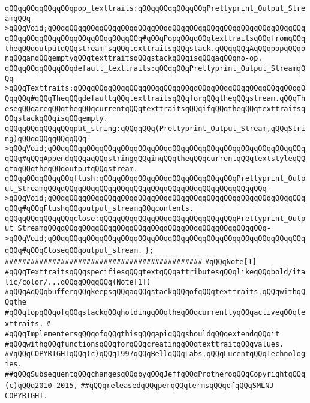 \verb|qQQqqQQqqQQqqQQqpop_texttraits:qQQqqQQqqQQqqQQqPrettyprint_Output_StreamqQQq->qQQqVoid;qQQqqQQqqQQqqQQqqQQqqQQqqQQqqQQqqQQqqQQqqQQqqQQqqQQqqQQqqQQqqQQqqQQqqQQqqQQqqQQqqQQqqQQqqQQq#qQQqPopqQQqqQQqtexttraitsqQQqfromqQQqtheqQQqoutputqQQqstream'sqQQqtexttraitsqQQqstack.qQQqqQQqAqQQqpopqQQqonqQQqanqQQqemptyqQQqtexttraitsqQQqstackqQQqisqQQqaqQQqno-op.|\newline
\newline
\verb|qQQqqQQqqQQqqQQqdefault_texttraits:qQQqqQQqPrettyprint_Output_StreamqQQq->qQQqTexttraits;qQQqqQQqqQQqqQQqqQQqqQQqqQQqqQQqqQQqqQQqqQQqqQQqqQQqqQQqqQQq#qQQqTheqQQqdefaultqQQqtexttraitsqQQqforqQQqtheqQQqstream.qQQqTheseqQQqareqQQqtheqQQqcurrentqQQqtexttraitsqQQqifqQQqtheqQQqtexttraitsqQQqstackqQQqisqQQqempty.|\newline
\newline
\verb|qQQqqQQqqQQqqQQqput_string:qQQqqQQq(Prettyprint_Output_Stream,qQQqString)qQQqqQQqqQQqqQQq->qQQqVoid;qQQqqQQqqQQqqQQqqQQqqQQqqQQqqQQqqQQqqQQqqQQqqQQqqQQqqQQqqQQqqQQq#qQQqAppendqQQqaqQQqstringqQQqinqQQqtheqQQqcurrentqQQqtextstyleqQQqtoqQQqtheqQQqoutputqQQqstream.|\newline
\newline
\verb|qQQqqQQqqQQqqQQqflush:qQQqqQQqqQQqqQQqqQQqqQQqqQQqqQQqPrettyprint_Output_StreamqQQqqQQqqQQqqQQqqQQqqQQqqQQqqQQqqQQqqQQqqQQqqQQqqQQq->qQQqVoid;qQQqqQQqqQQqqQQqqQQqqQQqqQQqqQQqqQQqqQQqqQQqqQQqqQQqqQQqqQQqqQQq#qQQqFlushqQQqoutput_streamqQQqcontents.|\newline
\verb|qQQqqQQqqQQqqQQqclose:qQQqqQQqqQQqqQQqqQQqqQQqqQQqqQQqPrettyprint_Output_StreamqQQqqQQqqQQqqQQqqQQqqQQqqQQqqQQqqQQqqQQqqQQqqQQqqQQq->qQQqVoid;qQQqqQQqqQQqqQQqqQQqqQQqqQQqqQQqqQQqqQQqqQQqqQQqqQQqqQQqqQQqqQQq#qQQqCloseqQQqoutput_stream.|\newline
\verb|};|\newline
\newline
\verb|##############################################|\newline
\verb|#qQQqNote[1]|\newline
\verb|#qQQqTexttraitsqQQqspecifiesqQQqtextqQQqattributesqQQqlikeqQQqbold/italic/color/...qQQqqQQqqQQq(Note[1])|\newline
\verb|#qQQqAqQQqbufferqQQqkeepsqQQqaqQQqstackqQQqofqQQqtexttraits,qQQqwithqQQqthe|\newline
\verb|#qQQqtopqQQqofqQQqstackqQQqholdingqQQqtheqQQqcurrentlyqQQqactiveqQQqtexttraits.|\newline
\verb|#|\newline
\verb|#qQQqImplementersqQQqofqQQqthisqQQqapiqQQqshouldqQQqextendqQQqit|\newline
\verb|#qQQqwithqQQqfunctionsqQQqforqQQqcreatingqQQqtexttraitqQQqvalues.|\newline
\newline
\newline
\verb|##qQQqCOPYRIGHTqQQq(c)qQQq1997qQQqBellqQQqLabs,qQQqLucentqQQqTechnologies.|\newline
\verb|##qQQqSubsequentqQQqchangesqQQqbyqQQqJeffqQQqProtheroqQQqCopyrightqQQq(c)qQQq2010-2015,|\newline
\verb|##qQQqreleasedqQQqperqQQqtermsqQQqofqQQqSMLNJ-COPYRIGHT.|\newline

